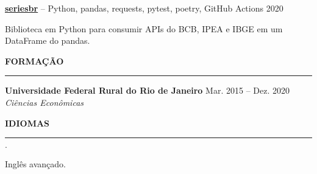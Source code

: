 \documentclass[11pt,letterpaper]{article}
\newenvironment{tightlist}
  {\begin{list}
    {$\cdot$}
    {
      \setlength{\leftmargin}{0em}
      \setlength{\itemsep}{-0.5em}
    }
    \smallskip
  }
{\end{list}}
\begin{document}
\medskip

\textbf{\href{https://github.com/phelipetls/seriesbr}{seriesbr}} -- Python, pandas, requests, pytest, poetry, GitHub Actions \hfill 2020
{\parfillskip=0pt\par}
Biblioteca em Python para consumir APIs do BCB, IPEA e IBGE em um DataFrame do pandas.

\medskip \textbf{FORMAÇÃO} \medskip
\hrule

\textbf{Universidade Federal Rural do Rio de Janeiro} \hfill {Mar. 2015 -- Dez. 2020} \\
\emph{Ciências Econômicas}

\medskip \textbf{IDIOMAS} \medskip
\hrule

\begin{tightlist}
  \item Inglês avançado.
\end{tightlist}
\end{document}
